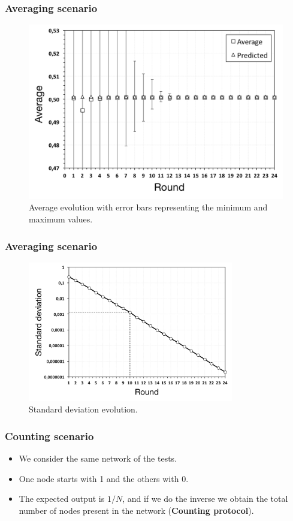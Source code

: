 \documentclass{beamer}
\begin{document}
\begin{frame}
\frametitle{Averaging scenario}
    
\begin{figure}[p]
\centering
\includegraphics[keepaspectratio=true, width=0.8\linewidth]{images/aggregation_average}
\caption{Average evolution with error bars representing the minimum and maximum values.}
\label{fig:aggregation_average}
\end{figure}
\end{frame}

\begin{frame}
\frametitle{Averaging scenario}
    
\begin{figure}[p]
\centering
\includegraphics[keepaspectratio=true, width=0.8\textwidth]{images/aggregation_standard_deviation}
\caption{Standard deviation evolution.}
\label{fig:aggregation_standard_deviation}
\end{figure}

\end{frame}

\begin{frame}
\frametitle{Counting scenario}

\begin{itemize}
  \item We consider the same network of the tests.
  \item One node starts with 1 and the others with 0.
  \item The expected output is $1/N$, and if we do the inverse we obtain the total number of nodes present in the network (\textbf{Counting protocol}).
\end{itemize}
\end{frame}
\end{document}
